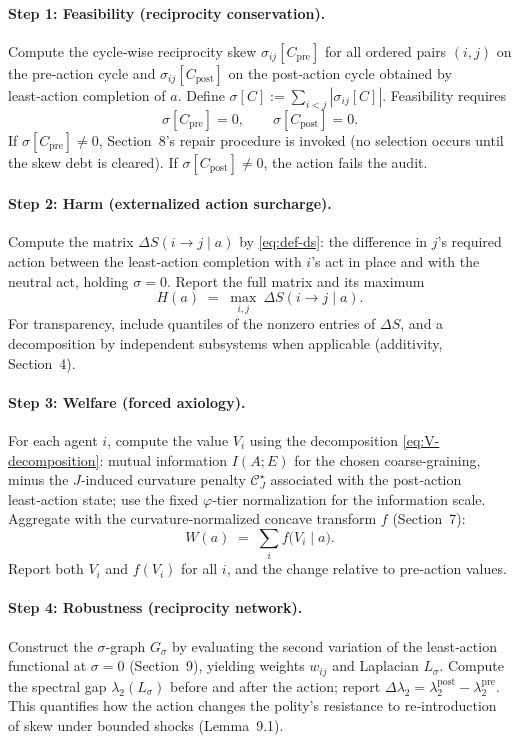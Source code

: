 \documentclass[11pt]{article}
\begin{document}
\paragraph{Step 1: Feasibility (reciprocity conservation).}
Compute the cycle‑wise reciprocity skew $\sigma_{ij}[C_{\mathrm{pre}}]$ for all ordered pairs $(i,j)$ on the pre‑action cycle and $\sigma_{ij}[C_{\mathrm{post}}]$ on the post‑action cycle obtained by least‑action completion of $a$. Define $\sigma[C]:=\sum_{i<j}|\sigma_{ij}[C]|$. Feasibility requires
\[
\sigma[C_{\mathrm{pre}}]=0,\qquad \sigma[C_{\mathrm{post}}]=0.
\]
If $\sigma[C_{\mathrm{pre}}]\neq 0$, Section~8’s repair procedure is invoked (no selection occurs until the skew debt is cleared). If $\sigma[C_{\mathrm{post}}]\neq 0$, the action fails the audit.

\paragraph{Step 2: Harm (externalized action surcharge).}
Compute the matrix $\Delta S(i\!\to\! j\mid a)$ by \eqref{eq:def-ds}: the difference in $j$’s required action between the least‑action completion with $i$’s act in place and with the neutral act, holding $\sigma\!=\!0$. Report the full matrix and its maximum
\[
H(a)\;=\;\max_{i,j}\ \Delta S(i\!\to\! j\mid a).
\]
For transparency, include quantiles of the nonzero entries of $\Delta S$, and a decomposition by independent subsystems when applicable (additivity, Section~4).

\paragraph{Step 3: Welfare (forced axiology).}
For each agent $i$, compute the value $V_i$ using the decomposition \eqref{eq:V-decomposition}: mutual information $I(A;E)$ for the chosen coarse‑graining, minus the $J$‑induced curvature penalty $\mathcal{C}_J^\star$ associated with the post‑action least‑action state; use the fixed $\varphi$‑tier normalization for the information scale. Aggregate with the curvature‑normalized concave transform $f$ (Section~7):
\[
W(a)\;=\;\sum_{i} f\big(V_i\mid a\big).
\]
Report both $V_i$ and $f(V_i)$ for all $i$, and the change relative to pre‑action values.

\paragraph{Step 4: Robustness (reciprocity network).}
Construct the $\sigma$‑graph $G_\sigma$ by evaluating the second variation of the least‑action functional at $\sigma\!=\!0$ (Section~9), yielding weights $w_{ij}$ and Laplacian $L_\sigma$. Compute the spectral gap $\lambda_2(L_\sigma)$ before and after the action; report $\Delta \lambda_2=\lambda_2^{\mathrm{post}}-\lambda_2^{\mathrm{pre}}$. This quantifies how the action changes the polity’s resistance to re‑introduction of skew under bounded shocks (Lemma~9.1).
\end{document}
